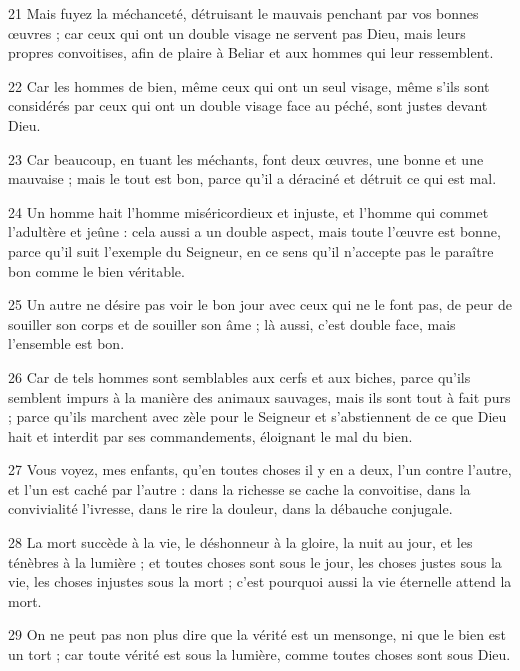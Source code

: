 \par 21 Mais fuyez la méchanceté, détruisant le mauvais penchant par vos bonnes œuvres ; car ceux qui ont un double visage ne servent pas Dieu, mais leurs propres convoitises, afin de plaire à Beliar et aux hommes qui leur ressemblent.

\par 22 Car les hommes de bien, même ceux qui ont un seul visage, même s'ils sont considérés par ceux qui ont un double visage face au péché, sont justes devant Dieu.

\par 23 Car beaucoup, en tuant les méchants, font deux œuvres, une bonne et une mauvaise ; mais le tout est bon, parce qu'il a déraciné et détruit ce qui est mal.

\par 24 Un homme hait l'homme miséricordieux et injuste, et l'homme qui commet l'adultère et jeûne : cela aussi a un double aspect, mais toute l'œuvre est bonne, parce qu'il suit l'exemple du Seigneur, en ce sens qu'il n'accepte pas le paraître bon comme le bien véritable.

\par 25 Un autre ne désire pas voir le bon jour avec ceux qui ne le font pas, de peur de souiller son corps et de souiller son âme ; là aussi, c'est double face, mais l'ensemble est bon.

\par 26 Car de tels hommes sont semblables aux cerfs et aux biches, parce qu'ils semblent impurs à la manière des animaux sauvages, mais ils sont tout à fait purs ; parce qu'ils marchent avec zèle pour le Seigneur et s'abstiennent de ce que Dieu hait et interdit par ses commandements, éloignant le mal du bien.

\par 27 Vous voyez, mes enfants, qu'en toutes choses il y en a deux, l'un contre l'autre, et l'un est caché par l'autre : dans la richesse se cache la convoitise, dans la convivialité l'ivresse, dans le rire la douleur, dans la débauche conjugale.

\par 28 La mort succède à la vie, le déshonneur à la gloire, la nuit au jour, et les ténèbres à la lumière ; et toutes choses sont sous le jour, les choses justes sous la vie, les choses injustes sous la mort ; c'est pourquoi aussi la vie éternelle attend la mort.

\par 29 On ne peut pas non plus dire que la vérité est un mensonge, ni que le bien est un tort ; car toute vérité est sous la lumière, comme toutes choses sont sous Dieu.

